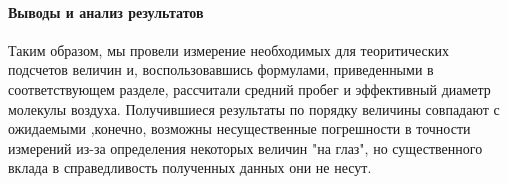 \documentclass{article}
\begin{document}
\paragraph{Выводы и анализ результатов}
Таким образом, мы провели измерение необходимых для теоритических подсчетов величин и, воспользовавшись формулами, приведенными в соответствующем разделе, рассчитали средний пробег и эффективный диаметр молекулы воздуха. Получившиеся результаты по порядку величины совпадают с ожидаемыми ,конечно, возможны несущественные погрешности в точности измерений из-за определения некоторых величин "на глаз", но существенного вклада в справедливость полученных данных они не несут.
\end{document}
